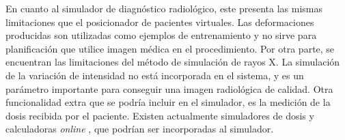 En cuanto al simulador de diagnóstico radiológico, este presenta las mismas limitaciones que el posicionador de pacientes virtuales. Las deformaciones producidas son utilizadas como ejemplos de entrenamiento y no sirve para planificación que utilice imagen médica en el procedimiento. Por otra parte, se encuentran las limitaciones del método de simulación de rayos X. La simulación de la variación de intensidad no está incorporada en el sistema, y es un parámetro importante para conseguir una imagen radiológica de calidad. 
Otra funcionalidad extra que se podría incluir en el simulador, es la medición de la dosis recibida por el paciente. Existen actualmente simuladores de dosis y calculadoras \emph{online} \cite{xraydose}, que podrían ser incorporadas al simulador.






